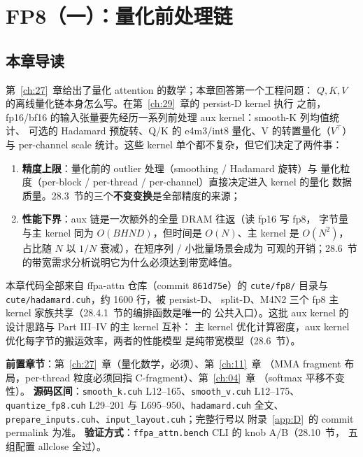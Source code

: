 \chapter{FP8（一）：量化前处理链}\label{ch:28}

\section{本章导读}

第~\ref{ch:27}~章给出了量化 attention 的数学；本章回答第一个工程问题：
$Q,K,V$ 的离线量化链本身怎么写。在第~\ref{ch:29}~章的 persist-D kernel 执行
之前，fp16/bf16 的输入张量要先经历一系列前处理 aux kernel：smooth-K 列均值统计、
可选的 Hadamard 预旋转、Q/K 的 e4m3/int8 量化、V 的转置量化（$V^{\top}$）与
per-channel scale 统计。这些 kernel 单个都不复杂，但它们决定了两件事：
\begin{enumerate}[itemsep=0pt,topsep=2pt]
  \item \textbf{精度上限}：量化前的 outlier 处理（smoothing / Hadamard 旋转）与
        量化粒度（per-block / per-thread / per-channel）直接决定进入 kernel 的量化
        数据质量。28.3~节的三个\textbf{不变变换}是全部精度的来源；
  \item \textbf{性能下界}：aux 链是一次额外的全量 DRAM 往返（读 fp16 写 fp8，
        字节量与主 kernel 同为 $O(BHND)$，但时间是 $O(N)$、主 kernel 是
        $O(N^2)$，占比随 $N$ 以 $1/N$ 衰减），在短序列 / 小批量场景会成为
        可观的开销；28.6~节的带宽需求分析说明它为什么必须达到带宽峰值。
\end{enumerate}

本章代码全部来自 ffpa-attn 仓库（commit \texttt{861d75e}）的
\texttt{cute/fp8/} 目录与 \texttt{cute/hadamard.cuh}，约 1600 行，被 persist-D、
split-D、M4N2 三个 fp8 主 kernel 家族共享（28.4.1~节的编排函数是唯一的
公共入口）。这批 aux kernel 的设计思路与 Part III--IV 的主 kernel 互补：
主 kernel 优化计算密度，aux kernel 优化每字节的搬运效率，两者的性能模型
是纯带宽模型（28.6~节）。

\textbf{前置章节}：第~\ref{ch:27}~章（量化数学，必须）、第~\ref{ch:11}~章
（MMA fragment 布局，per-thread 粒度必须回指 C-fragment）、第~\ref{ch:04}~章
（softmax 平移不变性）。
\textbf{源码区间}：\texttt{smooth\_k.cuh} L12--165、\texttt{smooth\_v.cuh}
L12--175、\texttt{quantize\_fp8.cuh} L29--201 与 L695--950、\texttt{hadamard.cuh}
全文、\texttt{prepare\_inputs.cuh}、\texttt{input\_layout.cuh}；完整行号以
附录~\ref{app:D}~的 commit permalink 为准。
\textbf{验证方式}：\texttt{ffpa\_attn.bench} CLI 的 knob A/B（28.10~节，
五组配置 allclose 全过）。

